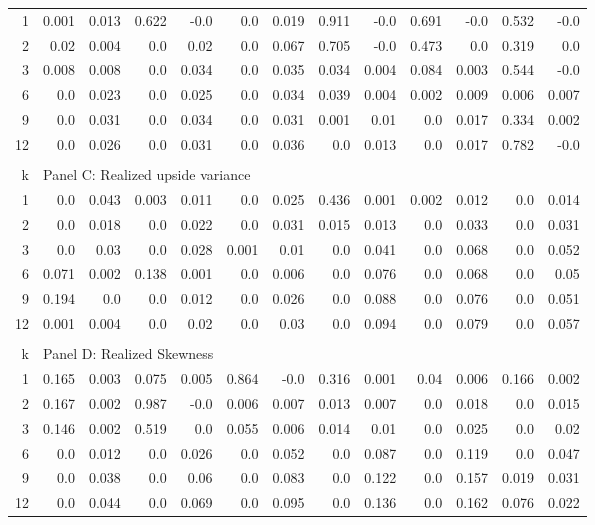 \documentclass{article}
\begin{document}
\begin{table}[h]
\begin{center}
\begin{tabular}{@{\extracolsep{6pt}}rrrrrrrrrrrrr@{}}
1 & 0.001 & 0.013 & 0.622 & -0.0 & 0.0 & 0.019 & 0.911 & -0.0 & 0.691 & -0.0 & 0.532 & -0.0 \\[6pt]
2 & 0.02 & 0.004 & 0.0 & 0.02 & 0.0 & 0.067 & 0.705 & -0.0 & 0.473 & 0.0 & 0.319 & 0.0 \\[6pt]
3 & 0.008 & 0.008 & 0.0 & 0.034 & 0.0 & 0.035 & 0.034 & 0.004 & 0.084 & 0.003 & 0.544 & -0.0 \\[6pt]
6 & 0.0 & 0.023 & 0.0 & 0.025 & 0.0 & 0.034 & 0.039 & 0.004 & 0.002 & 0.009 & 0.006 & 0.007 \\[6pt]
9 & 0.0 & 0.031 & 0.0 & 0.034 & 0.0 & 0.031 & 0.001 & 0.01 & 0.0 & 0.017 & 0.334 & 0.002 \\[6pt]
12 & 0.0 & 0.026 & 0.0 & 0.031 & 0.0 & 0.036 & 0.0 & 0.013 & 0.0 & 0.017 & 0.782 & -0.0 \\[6pt]


\hline\\[0.000000001pt]

k & \multicolumn{12}{l}{Panel C: Realized upside variance} \\[7pt]

\hline

1 & 0.0 & 0.043 & 0.003 & 0.011 & 0.0 & 0.025 & 0.436 & 0.001 & 0.002 & 0.012 & 0.0 & 0.014 \\[6pt]
2 & 0.0 & 0.018 & 0.0 & 0.022 & 0.0 & 0.031 & 0.015 & 0.013 & 0.0 & 0.033 & 0.0 & 0.031 \\[6pt]
3 & 0.0 & 0.03 & 0.0 & 0.028 & 0.001 & 0.01 & 0.0 & 0.041 & 0.0 & 0.068 & 0.0 & 0.052 \\[6pt]
6 & 0.071 & 0.002 & 0.138 & 0.001 & 0.0 & 0.006 & 0.0 & 0.076 & 0.0 & 0.068 & 0.0 & 0.05 \\[6pt]
9 & 0.194 & 0.0 & 0.0 & 0.012 & 0.0 & 0.026 & 0.0 & 0.088 & 0.0 & 0.076 & 0.0 & 0.051 \\[6pt]
12 & 0.001 & 0.004 & 0.0 & 0.02 & 0.0 & 0.03 & 0.0 & 0.094 & 0.0 & 0.079 & 0.0 & 0.057 \\[6pt]


\hline\\[0.000000001pt]

k & \multicolumn{12}{l}{Panel D: Realized Skewness} \\[7pt]

\hline

1 & 0.165 & 0.003 & 0.075 & 0.005 & 0.864 & -0.0 & 0.316 & 0.001 & 0.04 & 0.006 & 0.166 & 0.002 \\[6pt]
2 & 0.167 & 0.002 & 0.987 & -0.0 & 0.006 & 0.007 & 0.013 & 0.007 & 0.0 & 0.018 & 0.0 & 0.015 \\[6pt]
3 & 0.146 & 0.002 & 0.519 & 0.0 & 0.055 & 0.006 & 0.014 & 0.01 & 0.0 & 0.025 & 0.0 & 0.02 \\[6pt]
6 & 0.0 & 0.012 & 0.0 & 0.026 & 0.0 & 0.052 & 0.0 & 0.087 & 0.0 & 0.119 & 0.0 & 0.047 \\[6pt]
9 & 0.0 & 0.038 & 0.0 & 0.06 & 0.0 & 0.083 & 0.0 & 0.122 & 0.0 & 0.157 & 0.019 & 0.031 \\[6pt]
12 & 0.0 & 0.044 & 0.0 & 0.069 & 0.0 & 0.095 & 0.0 & 0.136 & 0.0 & 0.162 & 0.076 & 0.022 \\[6pt]



\end{tabular}
\end{center}
\end{table}
\end{document}

